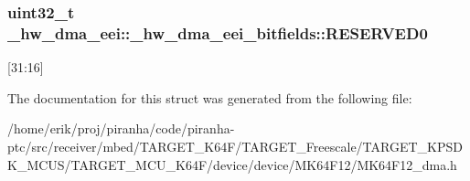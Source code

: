 \subsubsection[{\texorpdfstring{R\+E\+S\+E\+R\+V\+E\+D0}{RESERVED0}}]{\setlength{\rightskip}{0pt plus 5cm}uint32\+\_\+t \+\_\+hw\+\_\+dma\+\_\+eei\+::\+\_\+hw\+\_\+dma\+\_\+eei\+\_\+bitfields\+::\+R\+E\+S\+E\+R\+V\+E\+D0}\hypertarget{struct__hw__dma__eei_1_1__hw__dma__eei__bitfields_a2859369916f2db8fbcdf1c9890a134eb}{}\label{struct__hw__dma__eei_1_1__hw__dma__eei__bitfields_a2859369916f2db8fbcdf1c9890a134eb}
\mbox{[}31\+:16\mbox{]} 

The documentation for this struct was generated from the following file\+:\begin{DoxyCompactItemize}
\item 
/home/erik/proj/piranha/code/piranha-\/ptc/src/receiver/mbed/\+T\+A\+R\+G\+E\+T\+\_\+\+K64\+F/\+T\+A\+R\+G\+E\+T\+\_\+\+Freescale/\+T\+A\+R\+G\+E\+T\+\_\+\+K\+P\+S\+D\+K\+\_\+\+M\+C\+U\+S/\+T\+A\+R\+G\+E\+T\+\_\+\+M\+C\+U\+\_\+\+K64\+F/device/device/\+M\+K64\+F12/M\+K64\+F12\+\_\+dma.\+h\end{DoxyCompactItemize}
